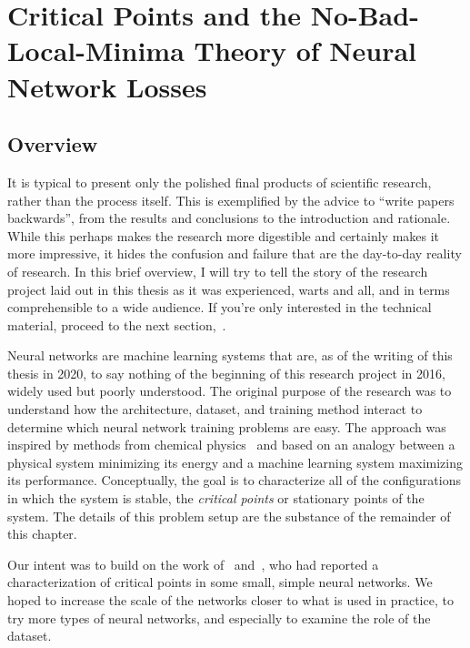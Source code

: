 \documentclass[../../thesis.tex]{subfiles}
\begin{document}
\chapter{Critical Points and the No-Bad-Local-Minima Theory of Neural Network Losses}
\onlyinsubfile{\begin{KeepFromToc}
		\tableofcontents
		\clearpage
		\listoffigures
		\listoftables
	\end{KeepFromToc}}
\onlyinsubfile{\clearpage}
\onlyinsubfile{\linenumbers}

\section{Overview}

It is typical to present only the polished final
products of scientific research,
rather than the process itself.
This is exemplified by the advice to
\enquote{write papers backwards},
from the results and conclusions to the introduction and rationale.
While this perhaps makes the research more digestible and
certainly makes it more impressive,
it hides the confusion and failure
that are the day-to-day reality of research.
In this brief overview,
I will try to tell the story of the research project
laid out in this thesis as it was experienced,
warts and all,
and in terms comprehensible to a wide audience.
If you're only interested in the technical material,
proceed to the next section,~.

Neural networks are machine learning systems
that are, as of the writing of this thesis in 2020,
to say nothing of the beginning of this research project in 2016,
widely used but poorly understood.
The original purpose of the research was to
understand how the
architecture, dataset, and training method
interact to determine which neural network training problems
are easy.
The approach was inspired by methods from chemical physics~\cite{ballard2017}
and based on an analogy between a physical system minimizing its energy
and a machine learning system maximizing its performance.
Conceptually, the goal is to characterize all of the configurations
in which the system is stable,
the \emph{critical points} or stationary points
of the system.
The details of this problem setup are the substance
of the remainder of this chapter.

Our intent was to build on the work
of~\cite{dauphin2014} and~\cite{pennington2017},
who had reported a characterization of critical points in
some small, simple neural networks.
We hoped to increase the scale of the networks
closer to what is used in practice,
to try more types of neural networks,
and especially to examine the role of the dataset.
\end{document}

